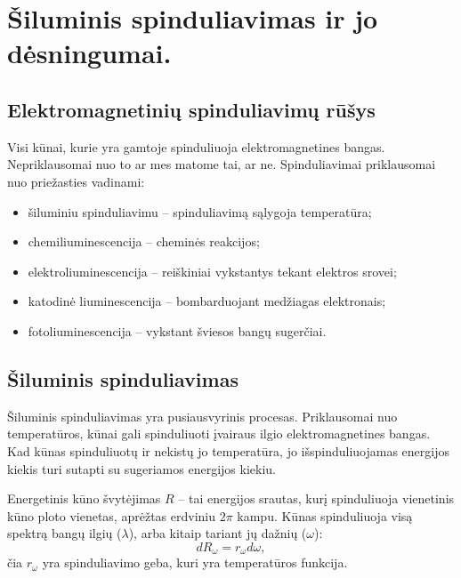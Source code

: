 \chapter{Šiluminis spinduliavimas ir jo dėsningumai.}


\section{Elektromagnetinių spinduliavimų rūšys}


Visi kūnai, kurie yra gamtoje spinduliuoja elektromagnetines bangas.
Nepriklausomai nuo to ar mes matome tai, ar ne. Spinduliavimai
priklausomai nuo priežasties vadinami:
\begin{itemize}
  \item šiluminiu spinduliavimu – spinduliavimą sąlygoja temperatūra;
  \item chemiliuminescencija – cheminės reakcijos;
  \item elektroliuminescencija – reiškiniai vykstantys tekant elektros
    srovei;
  \item katodinė liuminescencija – bombarduojant medžiagas elektronais;
  \item fotoliuminescencija – vykstant šviesos bangų sugerčiai.
\end{itemize}

\section{Šiluminis spinduliavimas}

Šiluminis spinduliavimas yra pusiausvyrinis procesas. Priklausomai
nuo temperatūros, kūnai gali spinduliuoti įvairaus ilgio
elektromagnetines bangas. Kad kūnas spinduliuotų ir nekistų jo
temperatūra, jo išspinduliuojamas energijos kiekis turi sutapti
su sugeriamos energijos kiekiu.

Energetinis kūno švytėjimas $R$ – tai energijos srautas, kurį
spinduliuoja vienetinis kūno ploto vienetas, aprėžtas erdviniu
$2\pi$ kampu. Kūnas spinduliuoja visą spektrą bangų ilgių ($\lambda$),
arba kitaip tariant jų dažnių ($\omega$):
\begin{equation*}
  d R_{\omega} = r_{\omega} d \omega,
\end{equation*}
čia $r_{\omega}$ yra spinduliavimo geba, kuri yra temperatūros funkcija.

